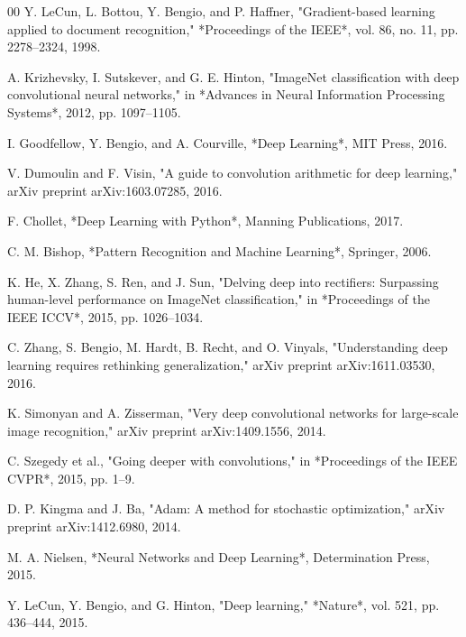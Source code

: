 \documentclass[conference]{IEEEtran}
\begin{document}
\begin{thebibliography}{00}
 Y. LeCun, L. Bottou, Y. Bengio, and P. Haffner, "Gradient-based learning applied to document recognition," *Proceedings of the IEEE*, vol. 86, no. 11, pp. 2278–2324, 1998.

 A. Krizhevsky, I. Sutskever, and G. E. Hinton, "ImageNet classification with deep convolutional neural networks," in *Advances in Neural Information Processing Systems*, 2012, pp. 1097–1105.

 I. Goodfellow, Y. Bengio, and A. Courville, *Deep Learning*, MIT Press, 2016.

 V. Dumoulin and F. Visin, "A guide to convolution arithmetic for deep learning," arXiv preprint arXiv:1603.07285, 2016.

 F. Chollet, *Deep Learning with Python*, Manning Publications, 2017.

 C. M. Bishop, *Pattern Recognition and Machine Learning*, Springer, 2006.

 K. He, X. Zhang, S. Ren, and J. Sun, "Delving deep into rectifiers: Surpassing human-level performance on ImageNet classification," in *Proceedings of the IEEE ICCV*, 2015, pp. 1026–1034.

 C. Zhang, S. Bengio, M. Hardt, B. Recht, and O. Vinyals, "Understanding deep learning requires rethinking generalization," arXiv preprint arXiv:1611.03530, 2016.

 K. Simonyan and A. Zisserman, "Very deep convolutional networks for large-scale image recognition," arXiv preprint arXiv:1409.1556, 2014.

 C. Szegedy et al., "Going deeper with convolutions," in *Proceedings of the IEEE CVPR*, 2015, pp. 1–9.

 D. P. Kingma and J. Ba, "Adam: A method for stochastic optimization," arXiv preprint arXiv:1412.6980, 2014.

 M. A. Nielsen, *Neural Networks and Deep Learning*, Determination Press, 2015.

 Y. LeCun, Y. Bengio, and G. Hinton, "Deep learning," *Nature*, vol. 521, pp. 436–444, 2015.

\end{thebibliography}
\end{document}
